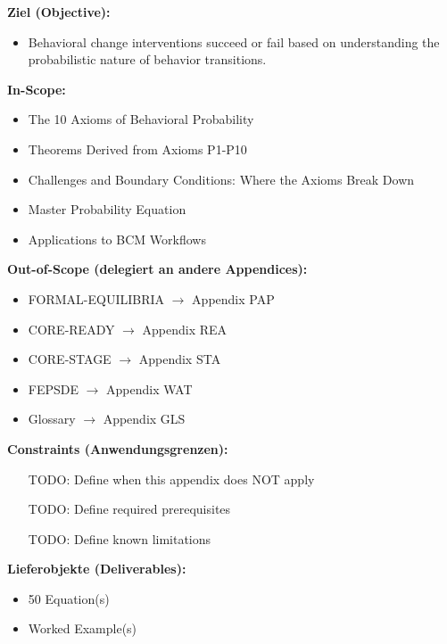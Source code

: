 \documentclass[11pt, a4paper]{article}
\begin{document}

\begin{tcolorbox}[
    colback=orange!5!white,
    colframe=orange!75!black,
    title={\textbf{Appendix Scope: Ziel / In-Scope / Out-of-Scope / Constraints}},
    fonttitle=\bfseries
]

\textbf{Ziel (Objective):}
\begin{itemize}[nosep]
    \item Behavioral change interventions succeed or fail based on understanding the probabilistic nature of behavior transitions.
\end{itemize}

\textbf{In-Scope:}
\begin{itemize}[nosep]
    \item The 10 Axioms of Behavioral Probability
    \item Theorems Derived from Axioms P1-P10
    \item Challenges and Boundary Conditions: Where the Axioms Break Down
    \item Master Probability Equation
    \item Applications to BCM Workflows
\end{itemize}

\textbf{Out-of-Scope (delegiert an andere Appendices):}
\begin{itemize}[nosep]
    \item FORMAL-EQUILIBRIA $\rightarrow$ Appendix PAP
    \item CORE-READY $\rightarrow$ Appendix REA
    \item CORE-STAGE $\rightarrow$ Appendix STA
    \item FEPSDE $\rightarrow$ Appendix WAT
    \item Glossary $\rightarrow$ Appendix GLS
\end{itemize}

\textbf{Constraints (Anwendungsgrenzen):}
\begin{itemize}[nosep]
    \item [TODO: Define when this appendix does NOT apply]
    \item [TODO: Define required prerequisites]
    \item [TODO: Define known limitations]
\end{itemize}

\textbf{Lieferobjekte (Deliverables):}
\begin{itemize}[nosep]
    \item 50 Equation(s)
    \item Worked Example(s)
\end{itemize}

\end{tcolorbox}
\end{document}
